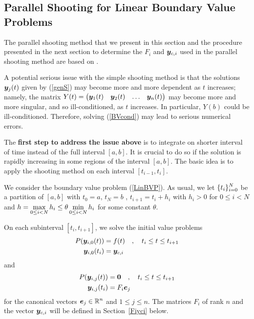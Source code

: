 \subsection{Parallel Shooting for Linear Boundary Value Problems}
\label{SectParShootLinBVP}

The parallel shooting method that we present in this section and the
procedure presented in the next section to determine the $F_i$ and
$\bm{y}_{c,i}$ used in the parallel shooting method are based on
\cite{CSD,K}. 

A potential serious issue with the simple shooting method is that
the solutions $\bm{y}_j(t)$ given by (\ref{genS}) may become more and
more dependent as $t$ increases; namely, the matrix
$Y(t) = \begin{pmatrix}
\bm{y}_1(t) & \bm{y}_2(t) & \ldots & \bm{y}_n(t) \end{pmatrix}$
may become more and more singular, and so ill-conditioned, as $t$
increases.  In particular, $Y(b)$ could be ill-conditioned.
Therefore, solving (\ref{BVcond}) may lead to serious numerical errors.

The {\bfseries first step to address the issue above} is to integrate
on shorter interval of time instead of the full interval $[a,b]$.
It is crucial to do so if the solution is rapidly increasing in some
regions of the interval $[a,b]$.  The basic idea is to apply the
shooting method on each interval  $[t_{i-1},t_i]$.

We consider the boundary value problem (\ref{LinBVP}).  As usual, we
let $\displaystyle \{ t_i \}_{i=0}^N$ be a partition of $[a,b]$
with $t_0 = a$, $t_N = b$ , $t_{i+1} = t_i + h_i$ with $h_i > 0$
for $0\leq i < N$ and
$\displaystyle h = \max_{0\leq i < N} h_i \leq \theta \min_{0\leq i < N} h_i$
for some constant $\theta$.

On each subinterval $[t_i,t_{i+1}]$, we solve the initial value
problems
\begin{equation} \label{parshootyci}
\begin{split}
P(\bm{y}_{i,0}(t)) &= f(t) \quad , \quad t_i \leq t \leq t_{i+1} \\
\bm{y}_{i,0}(t_i) &= \bm{y}_{c,i}
\end{split}
\end{equation}
and
\begin{equation}\label{parshootFi}
\begin{split}
P(\bm{y}_{i,j}(t)) &= \bm{0} \quad , \quad t_i \leq t \leq t_{i+1} \\
\bm{y}_{i,j}(t_i) &= F_i\bm{e}_j
\end{split}
\end{equation}
for the canonical vectors $\displaystyle \bm{e}_j \in \mathbb{R}^n$ and
$1 \leq j \leq n$.
The matrices $F_i$ of rank $n$ and the vector $\bm{y}_{c,i}$ will be
defined in Section~\ref{Fiyci} below.

